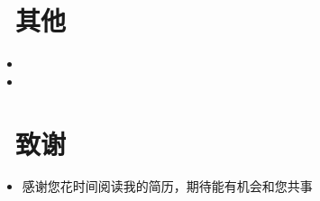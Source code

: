\documentclass{resume}
\begin{document}
\section{\faInfoCircle\ 其他}
\begin{itemize}[parsep=0.5ex]
    \item {}
    \item {}
\end{itemize}

\section{\faHeart\ 致谢}
\begin{itemize}[parsep=0.5ex]
    \item 感谢您花时间阅读我的简历，期待能有机会和您共事
\end{itemize}
\end{document}
